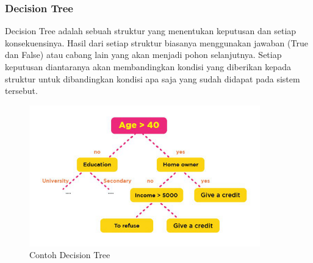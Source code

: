 \subsubsection{Decision Tree}

Decision Tree adalah sebuah struktur yang menentukan keputusan dan setiap konsekuensinya. Hasil dari setiap struktur biasanya menggunakan jawaban (True dan False) atau cabang lain yang akan menjadi pohon selanjutnya. Setiap keputusan diantaranya akan membandingkan kondisi yang diberikan kepada struktur untuk dibandingkan kondisi apa saja yang sudah didapat pada sistem tersebut.
\begin{figure}[H]
\centerline{\includegraphics[width=10cm]{figures/1174080/2/8.png}}
\caption{Contoh Decision Tree}
\label{labelgambar}
\end{figure}


